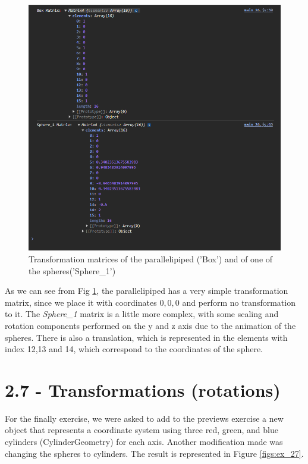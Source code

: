 \documentclass[12pt]{article}
\begin{document}
\begin{figure}[!h]
    \centering
        \includegraphics[width = \textwidth]{figs/ex_26_matrices.png}
        \caption{Transformation matrices of the parallelipiped ('Box') and of one of the spheres('Sphere\_1')}
        \label{figs:ex_26_matrices}
\end{figure}

As we can see from Fig \ref{figs:ex_26_matrices}, the parallelipiped has a very simple transformation matrix, since we place it with coordinates \(0,0,0\) and perform no transformation to it. The \textit{Sphere\_1} matrix is a little more complex, with some scaling and rotation components performed on the y and z axis due to the animation of the spheres. There is also a translation, which is represented in the elements with index 12,13 and 14, which correspond to the coordinates of the sphere.


\section*{2.7 - Transformations (rotations)}
\label{ex_27}

For the finally exercise, we were asked to add to the previews exercise a new object that represents a coordinate system using three red, green, and blue cylinders (CylinderGeometry) for each axis.\newline
Another modification made was changing the spheres to cylinders.\newline
The result is represented in Figure \ref{figs:ex_27}.
\end{document}
